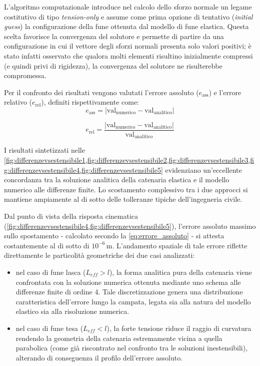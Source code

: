 L'algoritmo computazionale introduce nel calcolo dello sforzo normale un legame costitutivo di tipo \emph{tension-only} e assume come prima opzione di tentativo (\emph{initial guess}) la configurazione della fune ottenuta dal modello di fune elastica. Questa scelta favorisce la convergenza del solutore e permette di partire da una configurazione in cui il vettore degli sforzi normali presenta solo valori positivi; è stato infatti osservato che qualora molti elementi risultino inizialmente compressi (e quindi privi di rigidezza), la convergenza del solutore ne risulterebbe compromessa.

Per il confronto dei risultati vengono valutati l'errore assoluto ($e_{\text{ass}}$) e l'errore relativo ($e_{\text{rel}}$), definiti rispettivamente come:
\begin{equation}
   e_{\text{ass}} = \left| \text{val}_{\text{numerico}} - \text{val}_{\text{analitico}} \right|
   \label{eq:errore_assoluto}
\end{equation}

\begin{equation}
   e_{\text{rel}} = \frac{\left| \text{val}_{\text{numerico}} - \text{val}_{\text{analitico}} \right|}{\text{val}_{\text{analitico}}} 
   \label{eq:errore_relativo}
\end{equation}

\vspace{1em}
I risultati sintetizzati nelle \cref{fig:differenzevsestensibile1,fig:differenzevsestensibile2,fig:differenzevsestensibile3,fig:differenzevsestensibile4,fig:differenzevsestensibile5} evidenziano un'eccellente concordanza tra la soluzione analitica della catenaria elastica e il modello numerico alle differenze finite. Lo scostamento complessivo tra i due approcci si mantiene ampiamente al di sotto delle tolleranze tipiche dell'ingegneria civile.

Dal punto di vista della risposta cinematica (\cref{fig:differenzevsestensibile4,fig:differenzevsestensibile5}), l'errore assoluto massimo sullo spostamento - calcolato secondo la \cref{eq:errore_assoluto} - si attesta costantemente al di sotto di $10^{-6}\,\text{m}$. L'andamento spaziale di tale errore riflette direttamente le particolità geometriche dei due casi analizzati:
\begin{itemize}
   \item nel caso di fune lasca ($L_{eff} > l$), la forma analitica pura della catenaria viene confrontata con la soluzione numerica ottenuta mediante uno schema alle differenze finite di ordine 4. Tale discretizzazione genera una distribuzione caratteristica dell'errore lungo la campata, legata sia alla natura del modello elastico sia alla risoluzione numerica.
   \item nel caso di fune tesa ($L_{eff} < l$), la forte tensione riduce il raggio di curvatura rendendo la geometria della catenaria estremamente vicina a quella parabolica (come già riscontrato nel confronto tra le soluzioni inestensibili), alterando di conseguenza il profilo dell'errore assoluto.
\end{itemize}

